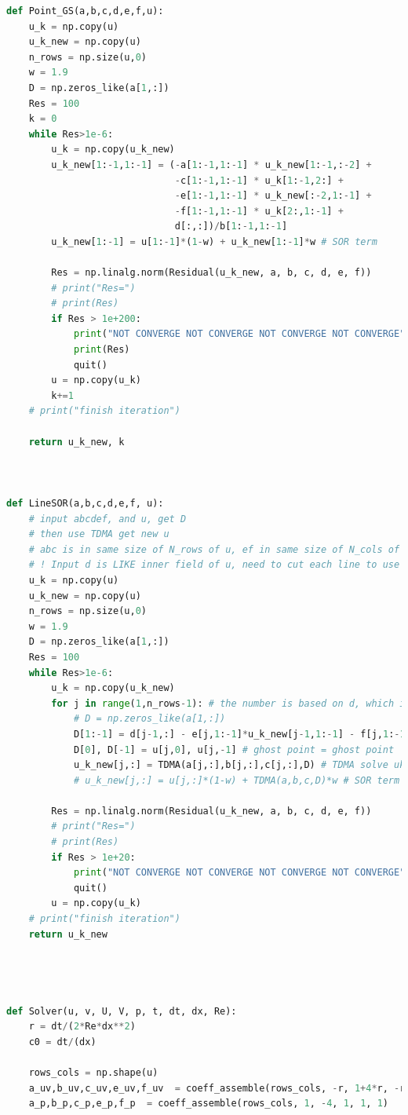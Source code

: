\documentclass[12pt]{article}
\begin{document}
\begin{scriptsize}
\begin{lstlisting}[language=python,caption={Lid Driven Cavity Solver}]
def Point_GS(a,b,c,d,e,f,u):
    u_k = np.copy(u)
    u_k_new = np.copy(u)
    n_rows = np.size(u,0)
    w = 1.9
    D = np.zeros_like(a[1,:])
    Res = 100
    k = 0
    while Res>1e-6:
        u_k = np.copy(u_k_new) 
        u_k_new[1:-1,1:-1] = (-a[1:-1,1:-1] * u_k_new[1:-1,:-2] +
                              -c[1:-1,1:-1] * u_k[1:-1,2:] +
                              -e[1:-1,1:-1] * u_k_new[:-2,1:-1] +
                              -f[1:-1,1:-1] * u_k[2:,1:-1] +
                              d[:,:])/b[1:-1,1:-1]
        u_k_new[1:-1] = u[1:-1]*(1-w) + u_k_new[1:-1]*w # SOR term
        
        Res = np.linalg.norm(Residual(u_k_new, a, b, c, d, e, f))
        # print("Res=")
        # print(Res) 
        if Res > 1e+200: 
            print("NOT CONVERGE NOT CONVERGE NOT CONVERGE NOT CONVERGE") 
            print(Res)
            quit()
        u = np.copy(u_k)
        k+=1
    # print("finish iteration")
        
    return u_k_new, k



def LineSOR(a,b,c,d,e,f, u): 
    # input abcdef, and u, get D
    # then use TDMA get new u
    # abc is in same size of N_rows of u, ef in same size of N_cols of u
    # ! Input d is LIKE inner field of u, need to cut each line to use !
    u_k = np.copy(u)
    u_k_new = np.copy(u)
    n_rows = np.size(u,0)
    w = 1.9
    D = np.zeros_like(a[1,:])
    Res = 100
    while Res>1e-6:
        u_k = np.copy(u_k_new) 
        for j in range(1,n_rows-1): # the number is based on d, which is (N-1)x(N-1)
            # D = np.zeros_like(a[1,:])
            D[1:-1] = d[j-1,:] - e[j,1:-1]*u_k_new[j-1,1:-1] - f[j,1:-1]*u_k[j+1,1:-1]
            D[0], D[-1] = u[j,0], u[j,-1] # ghost point = ghost point
            u_k_new[j,:] = TDMA(a[j,:],b[j,:],c[j,:],D) # TDMA solve uk each line
            # u_k_new[j,:] = u[j,:]*(1-w) + TDMA(a,b,c,D)*w # SOR term
        
        Res = np.linalg.norm(Residual(u_k_new, a, b, c, d, e, f))
        # print("Res=")
        # print(Res) 
        if Res > 1e+20: 
            print("NOT CONVERGE NOT CONVERGE NOT CONVERGE NOT CONVERGE") 
            quit()
        u = np.copy(u_k)
    # print("finish iteration")
    return u_k_new




def Solver(u, v, U, V, p, t, dt, dx, Re):
    r = dt/(2*Re*dx**2)
    c0 = dt/(dx)
    
    rows_cols = np.shape(u)
    a_uv,b_uv,c_uv,e_uv,f_uv  = coeff_assemble(rows_cols, -r, 1+4*r, -r, -r, -r)
    a_p,b_p,c_p,e_p,f_p  = coeff_assemble(rows_cols, 1, -4, 1, 1, 1)


\end{lstlisting}
\end{scriptsize}
\end{document}
